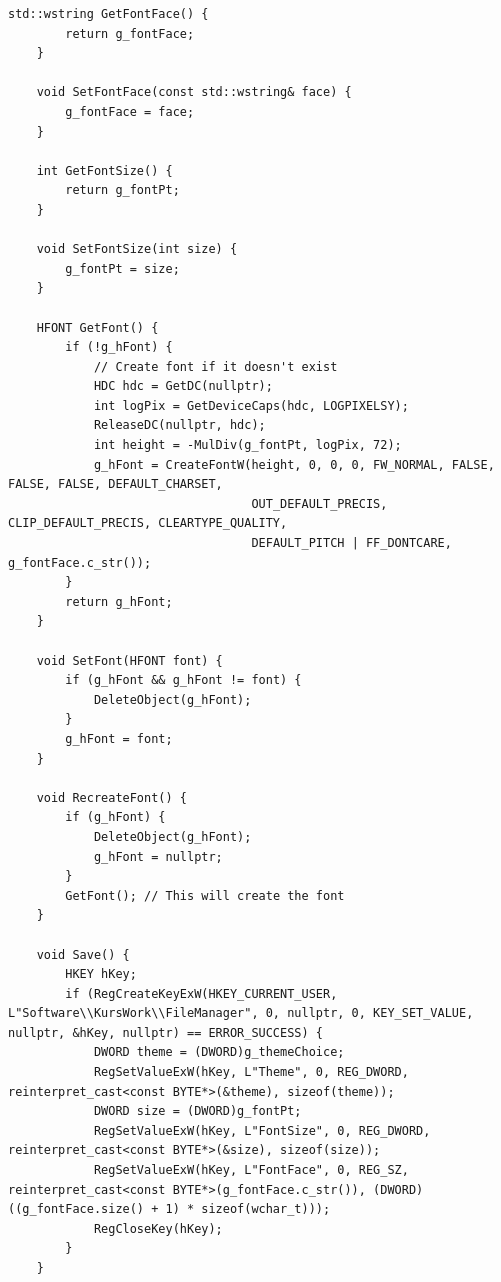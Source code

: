 \begin{lstlisting}[style=CodeListing]
    std::wstring GetFontFace() {
        return g_fontFace;
    }
    
    void SetFontFace(const std::wstring& face) {
        g_fontFace = face;
    }
    
    int GetFontSize() {
        return g_fontPt;
    }
    
    void SetFontSize(int size) {
        g_fontPt = size;
    }
    
    HFONT GetFont() {
        if (!g_hFont) {
            // Create font if it doesn't exist
            HDC hdc = GetDC(nullptr);
            int logPix = GetDeviceCaps(hdc, LOGPIXELSY);
            ReleaseDC(nullptr, hdc);
            int height = -MulDiv(g_fontPt, logPix, 72);
            g_hFont = CreateFontW(height, 0, 0, 0, FW_NORMAL, FALSE, FALSE, FALSE, DEFAULT_CHARSET,
                                  OUT_DEFAULT_PRECIS, CLIP_DEFAULT_PRECIS, CLEARTYPE_QUALITY,
                                  DEFAULT_PITCH | FF_DONTCARE, g_fontFace.c_str());
        }
        return g_hFont;
    }
    
    void SetFont(HFONT font) {
        if (g_hFont && g_hFont != font) {
            DeleteObject(g_hFont);
        }
        g_hFont = font;
    }
    
    void RecreateFont() {
        if (g_hFont) {
            DeleteObject(g_hFont);
            g_hFont = nullptr;
        }
        GetFont(); // This will create the font
    }
    
    void Save() {
        HKEY hKey;
        if (RegCreateKeyExW(HKEY_CURRENT_USER, L"Software\\KursWork\\FileManager", 0, nullptr, 0, KEY_SET_VALUE, nullptr, &hKey, nullptr) == ERROR_SUCCESS) {
            DWORD theme = (DWORD)g_themeChoice;
            RegSetValueExW(hKey, L"Theme", 0, REG_DWORD, reinterpret_cast<const BYTE*>(&theme), sizeof(theme));
            DWORD size = (DWORD)g_fontPt;
            RegSetValueExW(hKey, L"FontSize", 0, REG_DWORD, reinterpret_cast<const BYTE*>(&size), sizeof(size));
            RegSetValueExW(hKey, L"FontFace", 0, REG_SZ, reinterpret_cast<const BYTE*>(g_fontFace.c_str()), (DWORD)((g_fontFace.size() + 1) * sizeof(wchar_t)));
            RegCloseKey(hKey);
        }
    }
    

\end{lstlisting}
